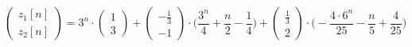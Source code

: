 \begin{displaymath}
\begin{pmatrix}
z_1[n]
\\
z_2[n]
\end{pmatrix} = 3^n \cdot \begin{pmatrix}
1
\\
3
\end{pmatrix} + \begin{pmatrix}
- \frac{1}{3}
\\
- 1
\end{pmatrix} \cdot \Big ( \frac{3^n}{4} + \frac{n}{2} - \frac{1}{4} \Big ) + \begin{pmatrix}
\frac{1}{3}
\\
2
\end{pmatrix} \cdot \Big ( -\frac{4 \cdot 6^n}{25} - \frac{n}{5} + \frac{4}{25} \Big )
\end{displaymath}



